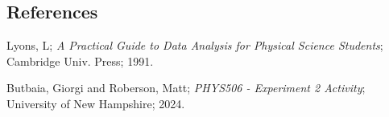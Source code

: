 \documentclass[prX,nofootinbib,notitlepage]{revtex4-1}
\begin{document}
\begin{thebibliography}{99}

\section{References}

Lyons, L;
\textit{A Practical Guide to Data Analysis for Physical Science Students};
Cambridge Univ. Press; 1991.

Butbaia, Giorgi and Roberson, Matt;
\textit{PHYS506 - Experiment 2 Activity};
University of New Hampshire; 2024.

\end{thebibliography}
\end{document}
